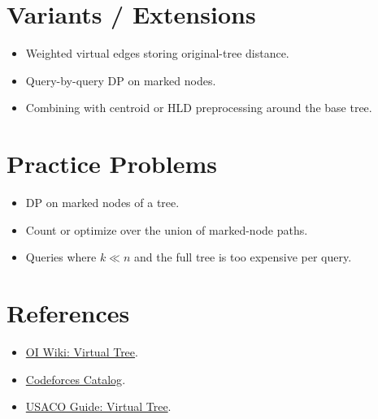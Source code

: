 \section*{Variants / Extensions}

\begin{itemize}
  \item Weighted virtual edges storing original-tree distance.
  \item Query-by-query DP on marked nodes.
  \item Combining with centroid or HLD preprocessing around the base tree.
\end{itemize}

\section*{Practice Problems}

\begin{itemize}
  \item DP on marked nodes of a tree.
  \item Count or optimize over the union of marked-node paths.
  \item Queries where \(k \ll n\) and the full tree is too expensive per query.
\end{itemize}

\section*{References}

\begin{itemize}
  \item \href{https://oiwiki.com/graph/virtual-tree/}{OI Wiki: Virtual Tree}.
  \item \href{https://codeforces.com/catalog}{Codeforces Catalog}.
  \item \href{https://usaco.guide/plat/VT?lang=cpp}{USACO Guide: Virtual Tree}.
\end{itemize}
